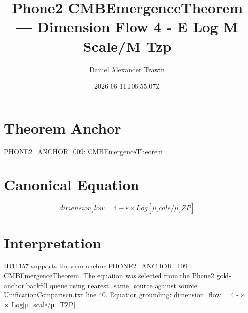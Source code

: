 \documentclass[11pt]{article}
\title{Phone2 CMBEmergenceTheorem — Dimension Flow 4 - Ε Log Μ Scale/Μ Tzp}
\author{Daniel Alexander Trawin}
\date{2026-06-11T06:55:07Z}
\begin{document}
\maketitle
\section*{Theorem Anchor}
PHONE2_ANCHOR_009: CMBEmergenceTheorem
\section*{Canonical Equation}
\[
dimension_flow = 4 - ε × Log[μ_scale/μ_TZP]
\]
\section*{Interpretation}
ID11157 supports theorem anchor PHONE2_ANCHOR_009 CMBEmergenceTheorem. The equation was selected from the Phone2 gold-anchor backfill queue using nearest_same_source against source UnificationComparison.txt line 40. Equation grounding: dimension_flow = 4 - ε × Log[μ_scale/μ_TZP]
\end{document}
